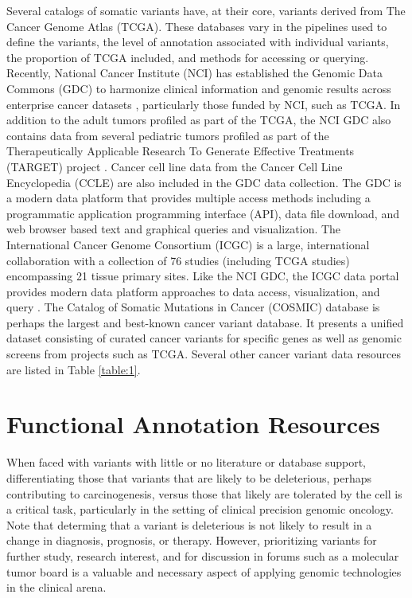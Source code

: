 \documentclass{article}
\begin{document}
Several catalogs of somatic variants have, at their core, variants
derived from The Cancer Genome Atlas (TCGA). These databases vary in
the pipelines used to define the variants, the level of annotation
associated with individual variants, the proportion of TCGA included,
and methods for accessing or querying. Recently, National Cancer
Institute (NCI) has established the Genomic Data Commons (GDC) to
harmonize clinical information and genomic results across enterprise
cancer datasets \cite{Grossman2016-sk}, particularly those funded by
NCI, such as TCGA. In addition to the adult tumors profiled as part of
the TCGA, the NCI GDC also contains data from several pediatric tumors
profiled as part of the Therapeutically Applicable Research To
Generate Effective Treatments (TARGET) project
\cite{noauthor_undated-ax}. Cancer cell line data from the Cancer Cell
Line Encyclopedia (CCLE) are also included \cite{Barretina2012-yz} in
the GDC data collection. The GDC is a modern data platform that
provides multiple access methods including a programmatic application
programming interface (API), data file download, and web browser based
text and graphical queries and visualization. The International Cancer
Genome Consortium (ICGC) is a large, international collaboration with
a collection of 76 studies (including TCGA studies) encompassing 21
tissue primary sites. Like the NCI GDC, the ICGC data portal provides
modern data platform approaches to data access, visualization, and
query \cite{Zhang2011-bl}. The Catalog of Somatic Mutations in Cancer
(COSMIC) database is perhaps the largest and best-known cancer variant
database. It presents a unified dataset consisting of curated cancer
variants for specific genes as well as genomic screens from projects
such as TCGA. Several other cancer variant data resources are listed
in Table \ref{table:1}.

\section{Functional Annotation Resources}

When faced with variants with little or no literature or database
support, differentiating those that variants that are likely to be
deleterious, perhaps contributing to carcinogenesis, versus those that
likely are tolerated by the cell is a critical task, particularly in
the setting of clinical precision genomic oncology. Note that
determing that a variant is deleterious is not likely to result in a
change in diagnosis, prognosis, or therapy. However, prioritizing
variants for further study, research interest, and for discussion in
forums such as a molecular tumor board is a valuable and necessary
aspect of applying genomic technologies in the clinical arena.
\end{document}
